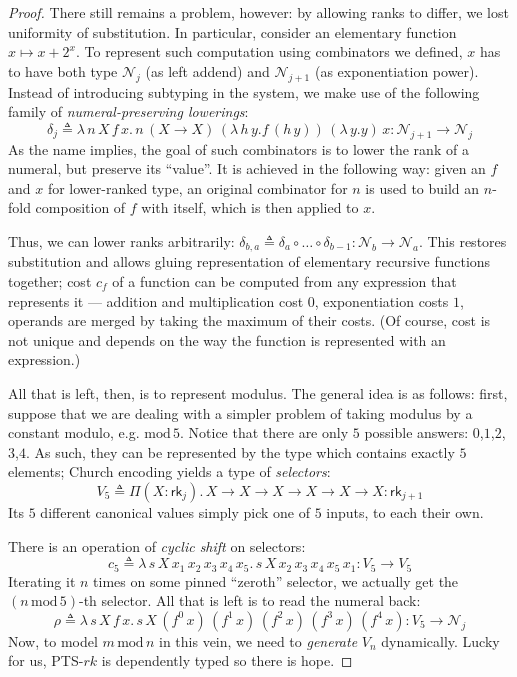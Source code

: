 \documentclass{article}
\theoremstyle{definition}
\theoremstyle{remark}
\begin{document}
\begin{proof}
    There still remains a problem, however: by allowing
    ranks to differ, we lost uniformity of
    substitution. In particular, consider an elementary
    function $x\mapsto x + 2^x$. To represent such
    computation using combinators we defined, $x$ has
    to have both type $\mathcal{N}_j$ (as left addend)
    and $\mathcal{N}_{j+1}$ (as exponentiation power).
    Instead of introducing subtyping in the system, we
    make use of the following family of
    \emph{numeral-preserving lowerings}:
    \[\delta_j\triangleq\lambda\,n\,X\,f\,x.\,
        n\,(X\to X)\,(\lambda\,h\,y.f\,(h\,y))\,
        (\lambda\,y.y)\,x
        :\mathcal{N}_{j+1}\to\mathcal{N}_j
    \]
    As the name implies, the goal of such combinators
    is to lower the rank of a numeral, but preserve its
    ``value''. It is achieved in the following way:
    given an $f$ and $x$ for lower-ranked type, an
    original combinator for $n$ is used to build an
    $n$-fold composition of $f$ with itself, which is
    then applied to $x$.

    Thus, we can lower ranks arbitrarily: $\delta_{b,a}
    \triangleq\delta_a\circ\ldots\circ\delta_{b-1}:
    \mathcal{N}_b\to\mathcal{N}_a$. This restores
    substitution and allows gluing representation of
    elementary recursive functions together; cost $c_f$
    of a function can be computed from any expression
    that represents it --- addition and multiplication
    cost $0$, exponentiation costs $1$, operands are
    merged by taking the maximum of their costs. (Of
    course, cost is not unique and depends on the way
    the function is represented with an expression.)

    All that is left, then, is to represent modulus.
    The general idea is as follows: first, suppose that
    we are dealing with a simpler problem of taking
    modulus by a constant modulo, e.g.
    $\mathrm{mod}\,5$. Notice that there are only $5$
    possible answers: $0$,$1$,$2$,$3$,$4$. As such,
    they can be represented by the type which contains
    exactly $5$ elements; Church encoding
    \cite{bohm1985automatic} yields a type of
    \emph{selectors}:
    \[V_5 \triangleq \Pi(X:\mathsf{rk}_j).\,
        X\to X\to X\to X\to X\to X
        :\mathsf{rk}_{j+1}
    \]
    Its $5$ different canonical values simply pick one
    of $5$ inputs, to each their own.

    There is an operation of \emph{cyclic shift} on
    selectors:
    \[c_5\triangleq \lambda\,s\,X\,x_1\,x_2\,x_3\,x_4
    \,x_5.\,s\,X\,x_2\,x_3\,x_4\,x_5\,x_1
    :V_5\to V_5\]
    Iterating it $n$ times on some pinned ``zeroth''
    selector, we actually get the
    $(n\,\mathrm{mod}\,5)$-th selector. All that is
    left is to read the numeral back:
    \[\rho\triangleq \lambda\,s\,X\,f\,x.\,s\,X\,
    (f^0\,x)\,(f^1\,x)\,(f^2\,x)\,(f^3\,x)\,(f^4\,x):
        V_5\to\mathcal{N}_j\]
    Now, to model $m\,\mathrm{mod}\,n$ in this vein, we
    need to \emph{generate} $V_n$ dynamically.
    Lucky for us, PTS-$rk$ is dependently typed so
    there is hope.


\end{proof}
\end{document}
